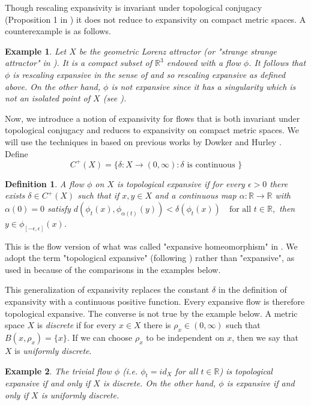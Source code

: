 \documentclass[11pt,letterpaper]{amsart}
\newtheorem{definition}{Definition}[section]
\newtheorem{ex}{Example}[section]
\begin{document}
Though rescaling expansivity is invariant under topological conjugacy (Proposition 1 in \cite{jny}) it does not reduce to expansivity on compact metric spaces.
A counterexample is as follows.


\begin{ex}
\label{lor}
Let $X$ be the {\em geometric Lorenz attractor} (or "strange strange attractor" in \cite{g}). It is a compact subset of $\mathbb{R}^3$ endowed with a flow $\phi$. It follows that $\phi$ is rescaling expansive in the sense of \cite{wew} and so
rescaling expansive as defined above. On the other hand, $\phi$ is not expansive since it has a singularity which is not an isolated point of $X$ (see \cite{bw}).
\end{ex}


Now, we introduce a notion of expansivity for flows that is both invariant under topological conjugacy and reduces to expansivity on compact metric spaces.
We will use the techniques in \cite{lny} based on previous works by Dowker \cite{d} and Hurley \cite{h}.
Define
$$
C^+(X)=\{\delta:X\to (0,\infty):\delta\mbox{ is continuous }\}
$$
\begin{definition}
\label{def1}
A flow $\phi$ on $X$ is {\em topological expansive} 
if for every $\epsilon > 0$ there exists $\delta \in C^+(X)$ such that if $x, y \in X$ and a continuous map $\alpha : \mathbb{R} \to \mathbb{R}$ with $\alpha(0) = 0$ satisfy
$d(\phi_t(x), \phi_{\alpha(t)}(y)) < \delta(\phi_t(x)) \quad \text{for all } t\in\mathbb{R},$
then $y \in \phi_{[-\epsilon,\epsilon]}(x)$.
\end{definition}

This is the flow version of what was called "expansive homeomorphism" in \cite{lny}. We adopt the term "topological expansive" (following \cite{c}) rather than "expansive", as used in \cite{lny} because of the comparisons in the examples below.


This generalization of expansivity replaces the constant $\delta$ in the definition of expansivity with a continuous positive function. Every expansive flow is therefore topological expansive. The converse is not true by the
example below. A metric space $X$ is {\em discrete} if for every $x\in X$ there is $\rho_x\in (0,\infty)$ such that $B(x,\rho_x)=\{x\}$.
If we can choose $\rho_x$ to be independent on $x$, then we say that
$X$ is {\em uniformly discrete}.


\begin{ex}
\label{go}
The trivial flow $\phi$ (i.e. $\phi_t=id_X$ for all $t\in\mathbb{R}$) is topological expansive if and only if $X$ is discrete.
On the other hand, $\phi$ is expansive if and only if $X$ is uniformly discrete.
\end{ex}
\end{document}
